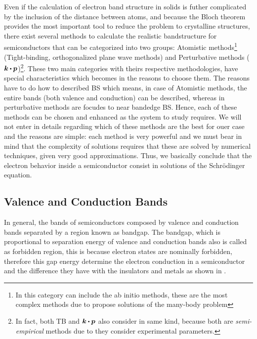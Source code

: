 Even if the calculation of electron band structure in solids is futher complicated by the inclusion of the distance between atoms, and because the Bloch theorem provides the most important tool to reduce the problem to crystalline structures, there exist several methods to calculate the realistic bandstructure for semiconductors that can be categorized into two groups: Atomistic methods\footnote{In this category can include the ab initio methods, these are the most complex methods due to propose  solutions of the many-body problem} (Tight-binding, orthogonalized plane wave methods) and Perturbative methods ($\boldsymbol{k}\bigcdot \boldsymbol{p}$)\footnote{In fact, both TB and $\boldsymbol{k}\bigcdot \boldsymbol{p}$ also consider in same kind, because both are \emph{semi-empirical} methods due to they consider experimental parameters.}. 
These two main categories with theirs respective methodologies, have special characteristics which becomes in the reasons to choose them. The reasons have to do how to  described \gls{BS} which means, in case of Atomistic methods, the entire bands  (both valence and conduction) can be described, whereas in perturbative methods are focudes to near bandedge \gls{BS}. Hence, each of these methods can be chosen and enhanced as the system to study requires. 
We will not enter in details regarding  which of these methods are the best for ouer case and the reasons are simple: each method is very powerful and we must bear in mind that the complexity of solutions requires that these are solved by numerical techniques, given very good approximations. 
Thus, we basically conclude that the electron behavior inside a semiconductor consist in solutions of the Schrödinger equation\cite{boer2018semiconductor}.  
\subsection{Valence and Conduction Bands}
\label{subsec:chapter-1-valence-and-conduction-bands}
\vspace{-10mm}
In general,  the bands of semiconductors composed by valence and conduction bands separated by a  region known as bandgap. 
The bandgap, which is proportional to separation energy of valence and conduction bands also is called as forbidden region, this is because electron states are nominally forbidden, therefore this gap energy determine the electron conduction in a semiconductor and the difference they have with the insulators and metals as shown in .  

